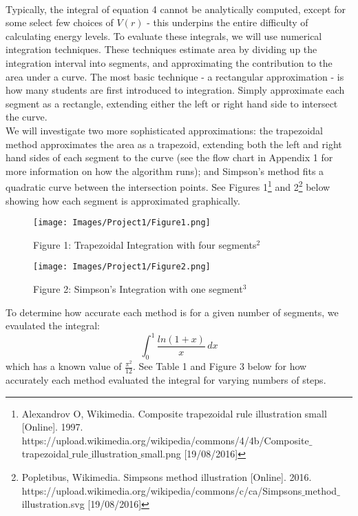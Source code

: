 \documentclass[10pt]{article}
\begin{document}
{\paragraph{}
Typically, the integral of equation 4 cannot be analytically computed, except for some select few choices of $V(r)$ - this underpins the entire difficulty of calculating energy levels. To evaluate these integrals, we will use numerical integration techniques.
These techniques estimate area by dividing up the integration interval into segments, and approximating the contribution to the area under a curve. The most basic technique - a rectangular approximation - is how many students are first introduced to integration. Simply approximate each segment as a rectangle, extending either the left or right hand side to intersect the curve. \\
We will investigate two more sophisticated approximations: the trapezoidal method approximates the area as a trapezoid, extending both the left and right hand sides of each segment to the curve (see the flow chart in Appendix 1 for more information on how the algorithm runs); and Simpson's method fits a quadratic curve between the intersection points. See Figures 1\footnote{Alexandrov O, Wikimedia. Composite trapezoidal rule illustration small [Online]. 1997. https://upload.wikimedia.org/wikipedia/commons/4/4b/Composite$\_$trapezoidal$\_$rule$\_$illustration$\_$small.png [19/08/2016]} and 2\footnote{Popletibus, Wikimedia. Simpsons method illustration [Online]. 2016. https://upload.wikimedia.org/wikipedia/commons/c/ca/Simpsons$\_$method$\_$illustration.svg [19/08/2016]} below showing how each segment is approximated graphically.

\begin{figure}[h]
\texttt{[image: Images/Project1/Figure1.png]}\centering \caption*{\footnotesize Figure 1: Trapezoidal Integration with four segments$^{2}$} \end{figure}

\begin{figure}[h]
\texttt{[image: Images/Project1/Figure2.png]}\centering \caption*{\footnotesize Figure 2: Simpson's Integration with one segment$^{3}$} \end{figure}

To determine how accurate each method is for a given number of segments, we evaulated the integral:
\begin{equation} \int_{0}^{1} \frac{ln(1+x)}{x} \, dx \end{equation}
which has a known value of $\frac{\pi^2}{12}$. See Table 1 and Figure 3 below for how accurately each method evaluated the integral for varying numbers of steps.

}
\end{document}
